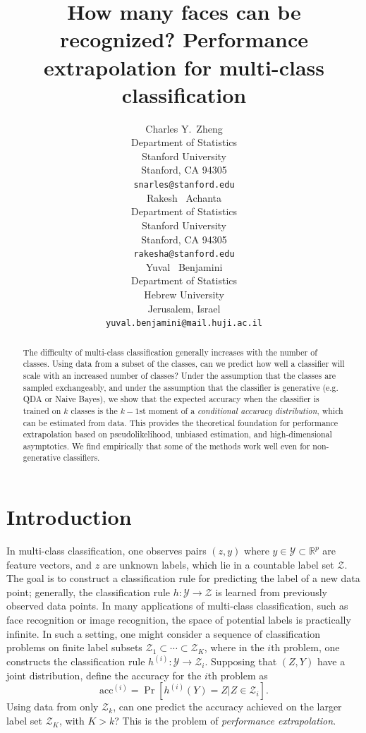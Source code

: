 \documentclass{article}
\title{How many faces can be recognized? Performance extrapolation for
  multi-class classification}
\author{
  Charles Y.~Zheng \\
  Department of Statistics\\
  Stanford University\\
  Stanford, CA 94305 \\
  \texttt{snarles@stanford.edu} \\
  \And
  Rakesh ~Achanta \\
  Department of Statistics\\
  Stanford University\\
  Stanford, CA 94305 \\
  \texttt{rakesha@stanford.edu} \\
  \And
  Yuval ~Benjamini \\
  Department of Statistics \\
  Hebrew University\\
  Jerusalem, Israel\\
  \texttt{yuval.benjamini@mail.huji.ac.il}
}
\begin{document}

\maketitle

\begin{abstract}
The difficulty of multi-class classification generally increases with
the number of classes.  Using data from a subset of the classes, 
can we predict how well a classifier will scale with an
increased number of classes?  Under the assumption that the classes
are sampled exchangeably, and under the assumption that
the classifier is generative (e.g. QDA or Naive Bayes), we show that the expected accuracy
when the classifier is trained on $k$ classes is the $k-1$st moment
of a \emph{conditional accuracy distribution}, which can be estimated from data.
This provides the theoretical foundation for performance extrapolation based on pseudolikelihood, 
unbiased estimation, and high-dimensional asymptotics.
We find empirically that some of the methods work well even for non-generative classifiers.
\end{abstract}

\section{Introduction}

In multi-class classification, one observes pairs $(z, y)$ where $y \in \mathcal{Y} \subset \mathbb{R}^p$ are feature vectors,
and $z$ are unknown labels, which lie in a countable label set $\mathcal{Z}$.  The goal is to construct a classification rule for
predicting the label of a new data point; generally, the classification rule $h: \mathcal{Y} \to \mathcal{Z}$
is learned from previously observed data points.  In many applications of multi-class classification,
such as face recognition or image recognition, the space of potential labels is practically infinite.
In such a setting, one might consider a sequence of classification problems on finite label subsets $\mathcal{Z}_1 \subset \cdots \subset \mathcal{Z}_K$, where in the $i$th problem, one constructs the classification rule $h^{(i)}:\mathcal{Y} \to \mathcal{Z}_i$.
Supposing that $(Z, Y)$ have a joint distribution, define the accuracy for the $i$th problem as
\[
\text{acc}^{(i)} = \Pr[h^{(i)}(Y) = Z|Z \in \mathcal{Z}_i].
\]
Using data from only $\mathcal{Z}_k$, can one predict the accuracy achieved on the larger label set $\mathcal{Z}_K$, with $K> k$?  This is the problem of \emph{performance extrapolation}.
\end{document}
